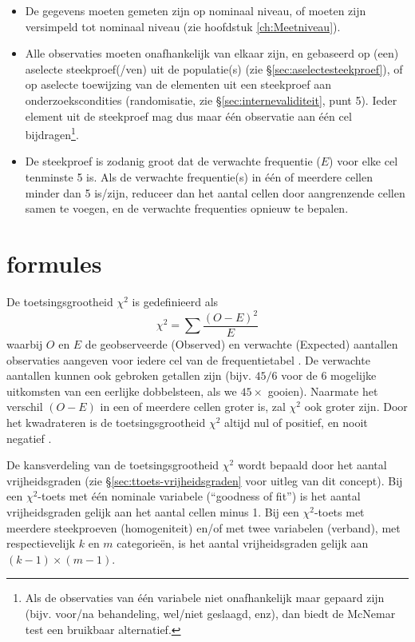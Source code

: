 \documentclass[
]{book}
\begin{document}
\begin{itemize}
\item
  De gegevens moeten gemeten zijn op nominaal niveau, of moeten
  zijn versimpeld tot nominaal niveau (zie hoofdstuk \ref{ch:Meetniveau}).
\item
  Alle observaties moeten onafhankelijk van elkaar zijn, en
  gebaseerd op (een) aselecte steekproef(/ven) uit de populatie(s) (zie
  §\ref{sec:aselectesteekproef}), of op aselecte toewijzing van de
  elementen uit een steekproef aan onderzoekscondities (randomisatie, zie §\ref{sec:internevaliditeit}, punt 5). Ieder element uit de steekproef mag dus maar één observatie aan één
  cel bijdragen\footnote{Als de observaties van één variabele niet onafhankelijk maar gepaard zijn (bijv. voor/na behandeling, wel/niet geslaagd, enz), dan biedt de McNemar test een bruikbaar alternatief.}.
\item
  De steekproef is zodanig groot dat de verwachte frequentie
  (\(E\)) voor elke cel tenminste 5 is. Als de verwachte frequentie(s) in
  één of meerdere cellen minder dan 5 is/zijn, reduceer dan het aantal
  cellen door aangrenzende cellen samen te voegen, en de verwachte
  frequenties opnieuw te bepalen.
\end{itemize}

\hypertarget{formules-6}{%
\section{formules}\label{formules-6}}

De toetsingsgrootheid \(\chi^2\) is gedefinieerd als
\begin{equation}
  \label{eq:chikwadraat}
    \chi^2 = \sum \frac{(O-E)^2}{E}
\end{equation}
waarbij \(O\) en \(E\) de
geobserveerde (Observed) en verwachte (Expected) aantallen observaties
aangeven voor iedere cel van de frequentietabel \citep{Ferg89}. De verwachte
aantallen kunnen ook gebroken getallen zijn (bijv. \(45/6\) voor de 6
mogelijke uitkomsten van een eerlijke dobbelsteen, als we \(45\times\)
gooien). Naarmate het verschil \((O-E)\) in een of meerdere cellen groter
is, zal \(\chi^2\) ook groter zijn. Door het kwadrateren is de
toetsingsgrootheid \(\chi^2\) altijd nul of positief, en nooit negatief
\citep{Ferg89}.

De kansverdeling van de toetsingsgrootheid \(\chi^2\) wordt bepaald door
het aantal vrijheidsgraden (zie
§\ref{sec:ttoets-vrijheidsgraden} voor uitleg van dit concept).
Bij een \(\chi^2\)-toets met één nominale variabele (``goodness of fit'') is het aantal
vrijheidsgraden gelijk aan het aantal cellen minus 1. Bij een \(\chi^2\)-toets met
meerdere steekproeven (homogeniteit) en/of met twee variabelen
(verband), met respectievelijk \(k\) en \(m\) categorieën, is het aantal
vrijheidsgraden gelijk aan \((k-1)\times(m-1)\).
\end{document}
